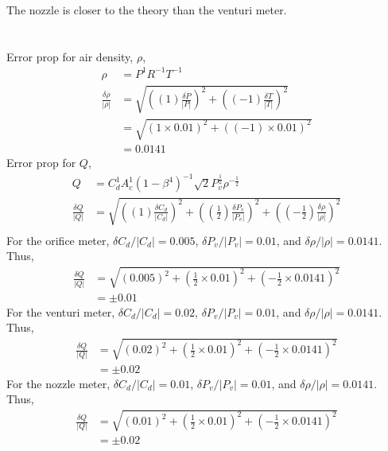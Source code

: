 The nozzle is closer to the theory than the venturi meter.

\section{}
Error prop for air density, $\rho$,
\begin{align*}
    \rho &= P^1 R^{-1} T^{-1} \\
    \frac{\delta \rho}{|\rho|} &= \sqrt{\left((1) \frac{\delta P}{|P|}\right)^2 +  \left((-1)\frac{\delta T}{|T|}\right)^2} \\
    &= \sqrt{\left(1\times 0.01\right)^2 + \left((-1)\times 0.01\right)^2} \\
    &= 0.0141
\end{align*}
Error prop for $Q$,
\begin{align*}
    Q &= C_{d}^1 A_{c}^1 (1-\beta^4)^{-1} \sqrt{2}P_{v}^{\frac{1}{2}} \rho^{-\frac{1}{2}} \\
    \frac{\delta Q}{|Q|} &= \sqrt{\left((1) \frac{\delta C_d}{|C_d|}\right)^2 + \left(\left(\frac{1}{2}\right)\frac{\delta P_v}{|P_v|}\right)^2
    + \left(\left(-\frac{1}{2}\right)\frac{\delta \rho}{|\rho|}\right)^2} \\
\end{align*}
For the orifice meter, $\delta C_d/|C_d| = 0.005$, $\delta P_v/|P_v| = 0.01$, and $\delta \rho/|\rho| = 0.0141$. Thus,
\begin{align*}
    \frac{\delta Q}{|Q|} &= \sqrt{\left(0.005\right)^2 + \left(\frac{1}{2}\times 0.01\right)^2 + \left(-\frac{1}{2}\times 0.0141\right)^2} \\
    &= \pm 0.01
\end{align*}
For the venturi meter, $\delta C_d/|C_d| = 0.02$, $\delta P_v/|P_v| = 0.01$, and $\delta \rho/|\rho| = 0.0141$. Thus,
\begin{align*}
    \frac{\delta Q}{|Q|} &= \sqrt{\left(0.02\right)^2 + \left(\frac{1}{2}\times 0.01\right)^2 + \left(-\frac{1}{2}\times 0.0141\right)^2} \\
    &= \pm 0.02
\end{align*}
For the nozzle meter, $\delta C_d/|C_d| = 0.01$, $\delta P_v/|P_v| = 0.01$, and $\delta \rho/|\rho| = 0.0141$. Thus,
\begin{align*}
    \frac{\delta Q}{|Q|} &= \sqrt{\left(0.01\right)^2 + \left(\frac{1}{2}\times 0.01\right)^2 + \left(-\frac{1}{2}\times 0.0141\right)^2} \\
    &= \pm 0.02
\end{align*}

